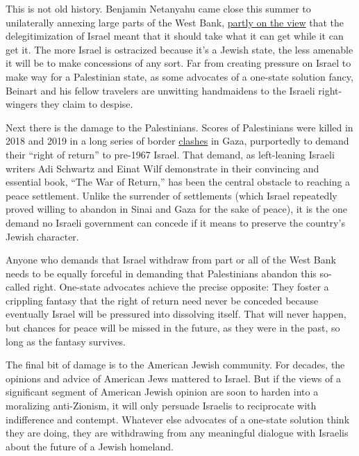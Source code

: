 This is not old history. Benjamin Netanyahu came close this summer to
unilaterally annexing large parts of the West Bank,
\href{https://www.washingtonpost.com/outlook/im-an-ardent-zionist-but-israels-annexation-makes-no-sense/2020/06/25/f949e6a4-b59e-11ea-a8da-693df3d7674a_story.html}{partly
on the view} that the delegitimization of Israel meant that it should
take what it can get while it can get it. The more Israel is ostracized
because it's a Jewish state, the less amenable it will be to make
concessions of any sort. Far from creating pressure on Israel to make
way for a Palestinian state, as some advocates of a one-state solution
fancy, Beinart and his fellow travelers are unwitting handmaidens to the
Israeli right-wingers they claim to despise.

Next there is the damage to the Palestinians. Scores of Palestinians
were killed in 2018 and 2019 in a long series of border
\href{https://www.theguardian.com/world/ng-interactive/2019/mar/29/a-year-of-bloodshed-at-gaza-border-protests}{clashes}
in Gaza, purportedly to demand their ``right of return'' to pre-1967
Israel. That demand, as left-leaning Israeli writers Adi Schwartz and
Einat Wilf demonstrate in their convincing and essential book, ``The War
of Return,'' has been the central obstacle to reaching a peace
settlement. Unlike the surrender of settlements (which Israel repeatedly
proved willing to abandon in Sinai and Gaza for the sake of peace), it
is the one demand no Israeli government can concede if it means to
preserve the country's Jewish character.

Anyone who demands that Israel withdraw from part or all of the West
Bank needs to be equally forceful in demanding that Palestinians abandon
this so-called right. One-state advocates achieve the precise opposite:
They foster a crippling fantasy that the right of return need never be
conceded because eventually Israel will be pressured into dissolving
itself. That will never happen, but chances for peace will be missed in
the future, as they were in the past, so long as the fantasy survives.

The final bit of damage is to the American Jewish community. For
decades, the opinions and advice of American Jews mattered to Israel.
But if the views of a significant segment of American Jewish opinion are
soon to harden into a moralizing anti-Zionism, it will only persuade
Israelis to reciprocate with indifference and contempt. Whatever else
advocates of a one-state solution think they are doing, they are
withdrawing from any meaningful dialogue with Israelis about the future
of a Jewish homeland.

